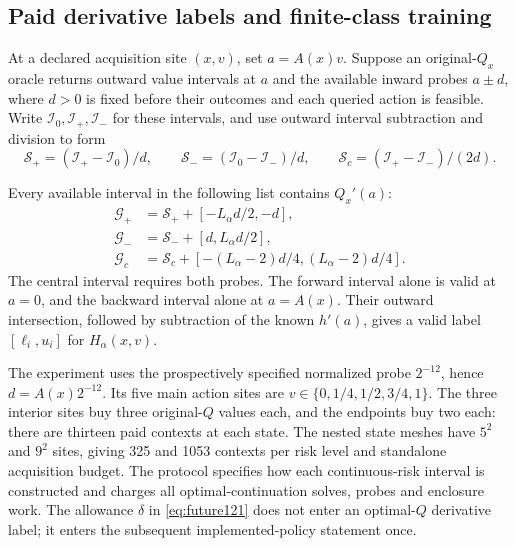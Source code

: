\subsection{Paid derivative labels and finite-class training}

At a declared acquisition site \((x,v)\), set \(a=A(x)v\).
Suppose an original-\(Q_x\) oracle returns outward value intervals at
\(a\) and the available inward probes \(a\pm d\), where \(d>0\)
is fixed before their outcomes and each queried action is feasible.
Write \(\mathcal I_0,\mathcal I_+,\mathcal I_-\) for these intervals,
and use outward interval subtraction and division to form
\[
 \mathcal S_+=(\mathcal I_+-\mathcal I_0)/d,\qquad
 \mathcal S_-=(\mathcal I_0-\mathcal I_-)/d,\qquad
 \mathcal S_c=(\mathcal I_+-\mathcal I_-)/(2d).
\]

\begin{proposition}
\label{prop:marginalprobe121}
Every available interval in the following list contains \(Q_x'(a)\):
\begin{align}
 \mathcal G_+
   &=\mathcal S_++[-L_\alpha d/2,-d],\nonumber\\
 \mathcal G_-
   &=\mathcal S_-+[d,L_\alpha d/2],\label{eq:secantlabels121}\\
 \mathcal G_c
   &=\mathcal S_c+
        [-(L_\alpha-2)d/4,(L_\alpha-2)d/4].\nonumber
\end{align}
The central interval requires both probes.  The forward interval alone
is valid at \(a=0\), and the backward interval alone at \(a=A(x)\).
Their outward intersection, followed by subtraction of the known
\(h'(a)\), gives a valid label
\([\ell_i,u_i]\) for \(H_\alpha(x,v)\).
\end{proposition}

The experiment uses the prospectively specified normalized probe
\(2^{-12}\), hence \(d=A(x)2^{-12}\).  Its five main action sites
are \(v\in\{0,1/4,1/2,3/4,1\}\).  The three interior sites buy
three original-\(Q\) values each, and the endpoints buy two each:
there are thirteen paid contexts at each state.  The nested state
meshes have \(5^2\) and \(9^2\) sites, giving 325 and 1053
contexts per risk level and standalone acquisition budget.
The protocol specifies how each continuous-risk interval is
constructed and charges all optimal-continuation solves, probes and
enclosure work.  The allowance \(\delta\) in \eqref{eq:future121}
does not enter an optimal-\(Q\) derivative label; it enters the
subsequent implemented-policy statement once.

